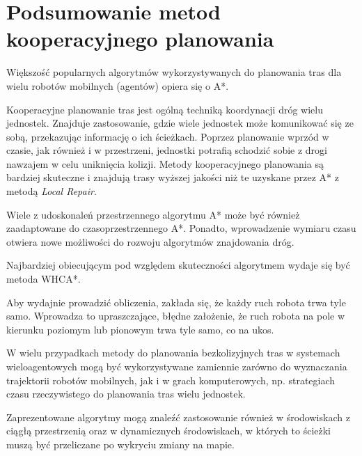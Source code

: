 \section{Podsumowanie metod kooperacyjnego planowania}

Większość popularnych algorytmów wykorzystywanych do planowania tras dla wielu robotów mobilnych (agentów) opiera się o A*.

Kooperacyjne planowanie tras jest ogólną techniką koordynacji dróg wielu jednostek.
Znajduje zastosowanie, gdzie wiele jednostek może komunikować się ze sobą, przekazując informację o ich ścieżkach.
Poprzez planowanie wprzód w czasie, jak również i w przestrzeni, jednostki potrafią schodzić sobie z drogi nawzajem w celu uniknięcia kolizji.
Metody kooperacyjnego planowania są bardziej skuteczne i znajdują trasy wyższej jakości niż te uzyskane przez A* z metodą {\it Local Repair}.

Wiele z udoskonaleń przestrzennego algorytmu A* może być również zaadaptowane do czasoprzestrzennego A*.
Ponadto, wprowadzenie wymiaru czasu otwiera nowe możliwości do rozwoju algorytmów znajdowania dróg.

Najbardziej obiecującym pod względem skuteczności algorytmem wydaje się być metoda WHCA*.

Aby wydajnie prowadzić obliczenia, zakłada się, że każdy ruch robota trwa tyle samo. 
Wprowadza to upraszczające, błędne założenie, że ruch robota na pole w kierunku poziomym lub pionowym trwa tyle samo, co na ukos.

W wielu przypadkach metody do planowania bezkolizyjnych tras w systemach wieloagentowych mogą być wykorzystywane zamiennie zarówno do wyznaczania trajektorii robotów mobilnych, jak i w grach komputerowych, np. strategiach czasu rzeczywistego do planowania tras wielu jednostek.

Zaprezentowane algorytmy mogą znaleźć zastosowanie również w środowiskach z ciągłą przestrzenią oraz w dynamicznych środowiskach, w których to ścieżki muszą być przeliczane po wykryciu zmiany na mapie.
